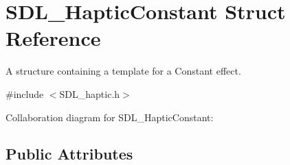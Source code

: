 \hypertarget{struct_s_d_l___haptic_constant}{}\section{S\+D\+L\+\_\+\+Haptic\+Constant Struct Reference}
\label{struct_s_d_l___haptic_constant}


A structure containing a template for a Constant effect.  




{\ttfamily \#include $<$S\+D\+L\+\_\+haptic.\+h$>$}



Collaboration diagram for S\+D\+L\+\_\+\+Haptic\+Constant\+:
\subsection*{Public Attributes}

